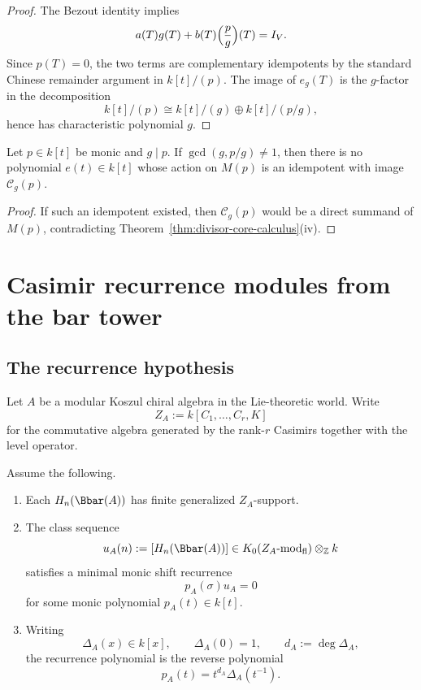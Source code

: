 \begin{proof}
The Bezout identity implies
\[
a(T)g(T)+b(T)\Bigl(\frac{p}{g}\Bigr)(T)=I_V.
\]
Since \(p(T)=0\), the two terms are complementary idempotents by the standard Chinese remainder argument in \(k[t]/(p)\).
The image of \(e_g(T)\) is the \(g\)-factor in the decomposition
\[
k[t]/(p)\cong k[t]/(g)\oplus k[t]/(p/g),
\]
hence has characteristic polynomial \(g\).
\end{proof}

\begin{proposition}
\ClaimStatusProvedHere
\label{prop:no-projector}
Let \(p\in k[t]\) be monic and \(g\mid p\).
If \(\gcd(g,p/g)\neq 1\), then there is no polynomial \(e(t)\in k[t]\) whose action on \(M(p)\) is an idempotent with image \(\mathcal C_g(p)\).
\end{proposition}

\begin{proof}
If such an idempotent existed, then \(\mathcal C_g(p)\) would be a direct summand of \(M(p)\), contradicting Theorem~\ref{thm:divisor-core-calculus}\textup{(iv)}.
\end{proof}

\section{Casimir recurrence modules from the bar tower}

\subsection{The recurrence hypothesis}

Let \(A\) be a modular Koszul chiral algebra in the Lie-theoretic world.
Write
\[
Z_A:=k[C_1,\dots,C_r,K]
\]
for the commutative algebra generated by the rank-\(r\) Casimirs together with the level operator.

\begin{hypothesis}
\label{hyp:finite-character-recurrence}
Assume the following.

\begin{enumerate}[label=\textup{(\roman*)}]
\item Each \(H_n(\Bbar(A))\) has finite generalized \(Z_A\)-support.

\item The class sequence
\[
u_A(n):=[H_n(\Bbar(A))]\in K_0(Z_A\text{-mod}_{\mathrm{fl}})\otimes_{\mathbb Z} k
\]
satisfies a minimal monic shift recurrence
\[
p_A(\sigma)u_A=0
\]
for some monic polynomial \(p_A(t)\in k[t]\).

\item Writing
\[
\Delta_A(x)\in k[x],\qquad \Delta_A(0)=1,\qquad d_A:=\deg \Delta_A,
\]
the recurrence polynomial is the reverse polynomial
\[
p_A(t)=t^{d_A}\Delta_A(t^{-1}).
\]
\end{enumerate}
\end{hypothesis}

